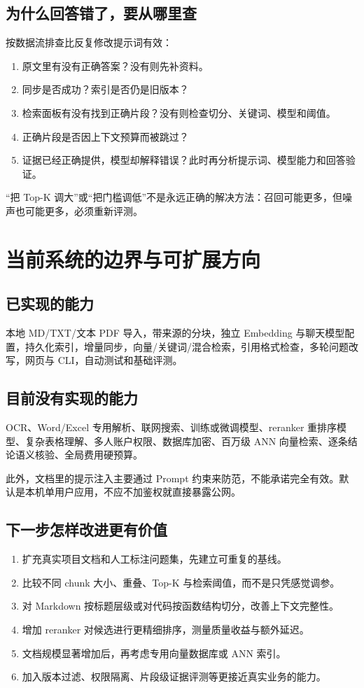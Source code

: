 \documentclass[UTF8,11pt,a4paper,fontset=fandol]{ctexart}
\begin{document}
\subsection{为什么回答错了，要从哪里查}
按数据流排查比反复修改提示词有效：
\begin{enumerate}
\item 原文里有没有正确答案？没有则先补资料。
\item 同步是否成功？索引是否仍是旧版本？
\item 检索面板有没有找到正确片段？没有则检查切分、关键词、模型和阈值。
\item 正确片段是否因上下文预算而被跳过？
\item 证据已经正确提供，模型却解释错误？此时再分析提示词、模型能力和回答验证。
\end{enumerate}
“把 Top-K 调大”或“把门槛调低”不是永远正确的解决方法：召回可能更多，但噪声也可能更多，必须重新评测。

\section{当前系统的边界与可扩展方向}

\subsection{已实现的能力}
本地 MD/TXT/文本 PDF 导入，带来源的分块，独立 Embedding 与聊天模型配置，持久化索引，增量同步，向量/关键词/混合检索，引用格式检查，多轮问题改写，网页与 CLI，自动测试和基础评测。

\subsection{目前没有实现的能力}
OCR、Word/Excel 专用解析、联网搜索、训练或微调模型、reranker 重排序模型、复杂表格理解、多人账户权限、数据库加密、百万级 ANN 向量检索、逐条结论语义核验、全局费用硬预算。

此外，文档里的提示注入主要通过 Prompt 约束来防范，不能承诺完全有效。默认是本机单用户应用，不应不加鉴权就直接暴露公网。

\subsection{下一步怎样改进更有价值}
\begin{enumerate}
\item 扩充真实项目文档和人工标注问题集，先建立可重复的基线。
\item 比较不同 chunk 大小、重叠、Top-K 与检索阈值，而不是只凭感觉调参。
\item 对 Markdown 按标题层级或对代码按函数结构切分，改善上下文完整性。
\item 增加 reranker 对候选进行更精细排序，测量质量收益与额外延迟。
\item 文档规模显著增加后，再考虑专用向量数据库或 ANN 索引。
\item 加入版本过滤、权限隔离、片段级证据评测等更接近真实业务的能力。
\end{enumerate}
\end{document}
